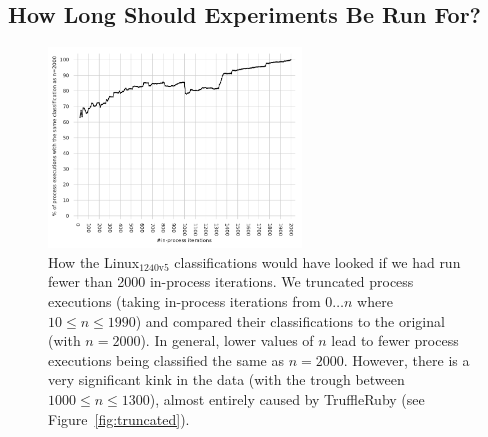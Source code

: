 \documentclass[acmsmall]{acmart}\settopmatter{printfolios=true}
\newcommand{\bencherseven}{Linux$_\mathrm{1240v5}$\xspace}
\begin{document}
\subsection{How Long Should Experiments Be Run For?}
\label{how long}

\begin{figure}[!tbp]
\centering
\includegraphics[width=0.6\textwidth]{examples/truncated_same_plot.pdf}
\caption{How the \bencherseven classifications would have looked if we had run fewer than
2000 in-process iterations. We truncated process
executions (taking in-process iterations from $0 \ldots n$ where $10 \leq n \leq
1990$) and compared their classifications to the original (with $n=2000$).
In general, lower values of $n$ lead to fewer process executions
being classified the same as $n=2000$. However, there is a very significant kink in the
data (with the trough between $1000 \leq n \leq 1300$), almost entirely caused by TruffleRuby (see
Figure~\ref{fig:truncated}).}
\label{fig:sametruncated}
\end{figure}
\end{document}
